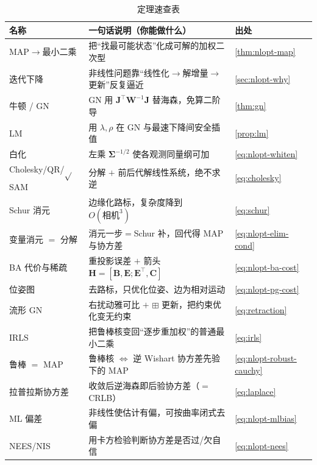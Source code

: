 \begin{table}[H]\centering\small
\caption{定理速查表}
\begin{tabular}{lll}
\toprule
名称 & 一句话说明（你能做什么） & 出处 \\
\midrule
MAP$\to$最小二乘 & 把“找最可能状态”化成可解的加权二次型 & \cref{thm:nlopt-map} \\
迭代下降 & 非线性问题靠“线性化$\to$解增量$\to$更新”反复逼近 & \cref{sec:nlopt-why} \\
牛顿 / GN & GN 用 $\mathbf{J}^\top\mathbf{W}^{-1}\mathbf{J}$ 替海森，免算二阶导 & \cref{thm:gn} \\
LM & 用 $\lambda,\rho$ 在 GN 与最速下降间安全插值 & \cref{prop:lm} \\
白化 & 左乘 $\boldsymbol{\Sigma}^{-1/2}$ 使各观测同量纲可加 & \cref{eq:nlopt-whiten} \\
Cholesky/QR/$\sqrt{}$SAM & 分解 $+$ 前后代解线性系统，绝不求逆 & \cref{eq:cholesky} \\
Schur 消元 & 边缘化路标，复杂度降到 $O(\text{相机}^3)$ & \cref{eq:schur} \\
变量消元 $=$ 分解 & 消元一步$=$Schur 补，回代得 MAP 与协方差 & \cref{eq:nlopt-elim-cond} \\
BA 代价与稀疏 & 重投影误差 $+$ 箭头 $\mathbf{H}=[\mathbf{B},\mathbf{E};\mathbf{E}^\top,\mathbf{C}]$ & \cref{eq:nlopt-ba-cost} \\
位姿图 & 去路标，只优化位姿、边为相对运动 & \cref{eq:nlopt-pg-cost} \\
流形 GN & 右扰动雅可比 $+$ $\boxplus$ 更新，把约束优化变无约束 & \cref{eq:retraction} \\
IRLS & 把鲁棒核变回“逐步重加权”的普通最小二乘 & \cref{eq:irls} \\
鲁棒 $=$ MAP & 鲁棒核 $\Leftrightarrow$ 逆 Wishart 协方差先验下的 MAP & \cref{eq:nlopt-robust-cauchy} \\
拉普拉斯协方差 & 收敛后逆海森即后验协方差（$=$ CRLB） & \cref{eq:laplace} \\
ML 偏差 & 非线性使估计有偏，可按曲率闭式去偏 & \cref{eq:nlopt-mlbias} \\
NEES/NIS & 用卡方检验判断协方差是否过/欠自信 & \cref{eq:nlopt-nees} \\
\bottomrule
\end{tabular}
\end{table}

